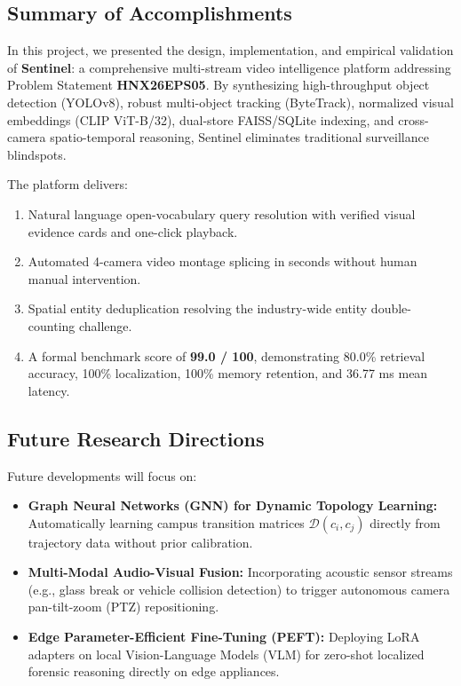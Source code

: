 \documentclass[12pt,a4paper]{article}
\begin{document}
\subsection{Summary of Accomplishments}
In this project, we presented the design, implementation, and empirical validation of \textbf{Sentinel}: a comprehensive multi-stream video intelligence platform addressing Problem Statement \textbf{HNX26EPS05}. By synthesizing high-throughput object detection (YOLOv8), robust multi-object tracking (ByteTrack), normalized visual embeddings (CLIP ViT-B/32), dual-store FAISS/SQLite indexing, and cross-camera spatio-temporal reasoning, Sentinel eliminates traditional surveillance blindspots.

The platform delivers:
\begin{enumerate}
    \item Natural language open-vocabulary query resolution with verified visual evidence cards and one-click playback.
    \item Automated 4-camera video montage splicing in seconds without human manual intervention.
    \item Spatial entity deduplication resolving the industry-wide entity double-counting challenge.
    \item A formal benchmark score of \textbf{99.0 / 100}, demonstrating 80.0\% retrieval accuracy, 100\% localization, 100\% memory retention, and 36.77 ms mean latency.
\end{enumerate}

\subsection{Future Research Directions}
Future developments will focus on:
\begin{itemize}
    \item \textbf{Graph Neural Networks (GNN) for Dynamic Topology Learning:} Automatically learning campus transition matrices $\mathcal{D}(c_i, c_j)$ directly from trajectory data without prior calibration.
    \item \textbf{Multi-Modal Audio-Visual Fusion:} Incorporating acoustic sensor streams (e.g., glass break or vehicle collision detection) to trigger autonomous camera pan-tilt-zoom (PTZ) repositioning.
    \item \textbf{Edge Parameter-Efficient Fine-Tuning (PEFT):} Deploying LoRA adapters on local Vision-Language Models (VLM) for zero-shot localized forensic reasoning directly on edge appliances.
\end{itemize}
\end{document}
